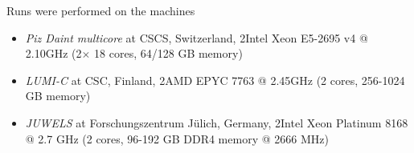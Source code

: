 Runs were performed on the machines
\begin{itemize}
    \item \emph{Piz Daint multicore} at CSCS, Switzerland, 2\x Intel\textsuperscript{\textregistered} Xeon\textsuperscript{\textregistered} E5-2695 v4 @ 2.10GHz (2$\times$ 18 cores, 64/128 GB memory)
    \item \emph{LUMI-C} at CSC, Finland, 2\x AMD EPYC\textsuperscript{\texttrademark} 7763 @ 2.45GHz (2 cores, 256-1024 GB memory)
    \item \emph{JUWELS} at Forschungszentrum Jülich, Germany, 2\x Intel\textsuperscript{\textregistered} Xeon\textsuperscript{\textregistered} Platinum 8168 @ 2.7 GHz (2 cores, 96-192 GB DDR4 memory @ 2666 MHz)
\end{itemize}



